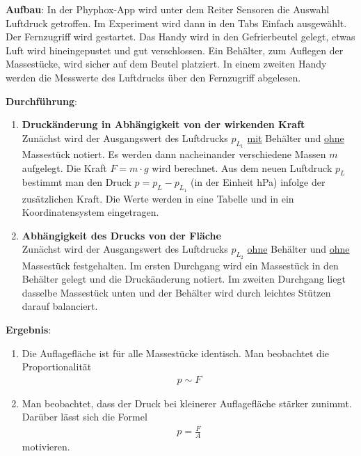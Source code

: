 \documentclass[../main.tex]{subfiles}
\begin{document}
\begin{tcolorbox}
    \vspace{0.4cm}
    \textbf{Aufbau}: In der Phyphox-App wird unter dem Reiter \glqq Sensoren\grqq{} die Auswahl \glqq Luftdruck\grqq{} getroffen. Im Experiment wird dann in den Tabs \glqq Einfach\grqq{} ausgewählt. Der Fernzugriff wird gestartet. Das Handy wird in den Gefrierbeutel gelegt, etwas Luft wird hineingepustet und gut verschlossen. Ein Behälter, zum Auflegen der Massestücke, wird sicher auf dem Beutel platziert. In einem zweiten Handy werden die Messwerte des Luftdrucks über den Fernzugriff abgelesen.  

    \vspace{0.4cm}
    \textbf{Durchführung}: 
    \begin{enumerate}
        \item \textbf{Druckänderung in Abhängigkeit von der wirkenden Kraft} \\
            Zunächst wird der Ausgangswert des Luftdrucks $p_{L_1}$ \underline{mit} Behälter und \underline{ohne} Massestück notiert. Es werden dann nacheinander verschiedene Massen $m$ aufgelegt. Die Kraft $F = m \cdot g$ wird berechnet. Aus dem neuen Luftdruck $p_L$ bestimmt man den Druck $p = p_L - p_{L_1}$ (in der Einheit hPa) infolge der zusätzlichen Kraft. Die Werte werden in eine Tabelle und in ein Koordinatensystem eingetragen.
        \item \textbf{Abhängigkeit des Drucks von der Fläche}\\
            Zunächst wird der Ausgangswert des Luftdrucks $p_{L_2}$ \underline{ohne} Behälter und \underline{ohne} Massestück festgehalten. Im ersten Durchgang wird ein Massestück in den Behälter gelegt und die Druckänderung notiert. Im zweiten Durchgang liegt dasselbe Massestück unten und der Behälter wird durch leichtes Stützen darauf balanciert.  

    \end{enumerate}

    \vspace{0.4cm}
    \textbf{Ergebnis}: 
    \begin{enumerate}
        \item Die Auflagefläche ist für alle Massestücke identisch. Man beobachtet die Proportionalität
            \begin{align*}
                p \sim F
            \end{align*}
        \item Man beobachtet, dass der Druck bei kleinerer Auflagefläche stärker zunimmt. Darüber lässt sich die Formel
            \begin{align*}
                p = \frac{F}{A}
            \end{align*}
            motivieren.
    \end{enumerate}

\end{tcolorbox}
\end{document}
